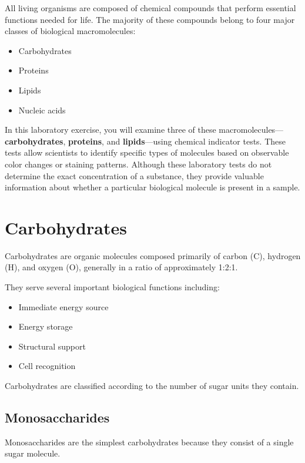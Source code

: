 \documentclass[
  letterpaper,
  DIV=11,
  numbers=noendperiod]{scrreprt}
\begin{document}
All living organisms are composed of chemical compounds that perform
essential functions needed for life. The majority of these compounds
belong to four major classes of biological macromolecules:

\begin{itemize}
\item
  Carbohydrates
\item
  Proteins
\item
  Lipids
\item
  Nucleic acids
\end{itemize}

In this laboratory exercise, you will examine three of these
macromolecules---\textbf{carbohydrates}, \textbf{proteins}, and
\textbf{lipids}---using chemical indicator tests. These tests allow
scientists to identify specific types of molecules based on observable
color changes or staining patterns. Although these laboratory tests do
not determine the exact concentration of a substance, they provide
valuable information about whether a particular biological molecule is
present in a sample.

\section{\texorpdfstring{\textbf{Carbohydrates}}{Carbohydrates}}\label{carbohydrates}

Carbohydrates are organic molecules composed primarily of carbon (C),
hydrogen (H), and oxygen (O), generally in a ratio of approximately
1:2:1.

They serve several important biological functions including:

\begin{itemize}
\item
  Immediate energy source
\item
  Energy storage
\item
  Structural support
\item
  Cell recognition
\end{itemize}

Carbohydrates are classified according to the number of sugar units they
contain.

\subsection{\texorpdfstring{\textbf{Monosaccharides}}{Monosaccharides}}\label{monosaccharides}

Monosaccharides are the simplest carbohydrates because they consist of a
single sugar molecule.
\end{document}

